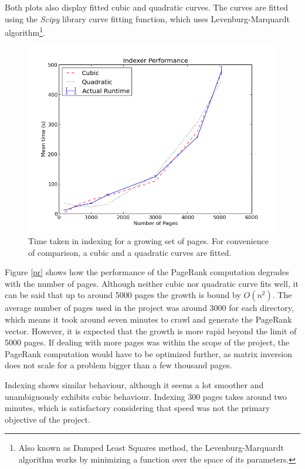 \documentclass[12pt,notitlepage,twoside]{scrreprt}
\begin{document}
Both plots also display fitted cubic and quadratic curves. The curves are fitted using the
\textit{Scipy} library curve fitting function, which uses Levenburg-Marquardt
algorithm\footnote{Also known as Damped Least Squares method, the Levenburg-Marquardt
algorithm works by minimizing a function over the space of its parameters.}. 
\begin{figure}[h!]
  \centering
    \includegraphics[width=\linewidth]{figs/ind.png}
    \caption{Time taken in indexing for a growing set of pages. For convenience
	    of comparison, a cubic and a quadratic curves are fitted.\label{ind}}
\end{figure}
Figure \ref{pr} shows how the performance of the PageRank computation degrades with the
number of pages. Although neither cubic nor quadratic curve fits well, it can be said that
up to around 5000 pages the growth is bound by \(O(n^2)\). The average number of pages
used in the project was around 3000 for each directory, which means it took around seven
minutes to crawl and generate the PageRank vector.  However, it is expected that the
growth is more rapid beyond the limit of 5000 pages. If dealing with more pages was within
the scope of the project, the PageRank computation would have to be optimized further, as
matrix inversion does not scale for a problem bigger than a few thousand pages.

Indexing shows similar behaviour, although it seems a lot smoother and unambiguously exhibits cubic
behaviour. Indexing 300 pages takes around two minutes, which is satisfactory considering
that speed was not the primary objective of the project.
\end{document}
